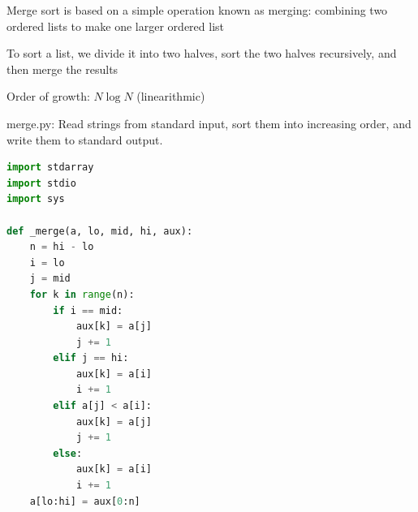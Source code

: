 \documentclass[8pt,a4paper,compress]{beamer}
\begin{document}
\begin{frame}[fragile]
\pause

Merge sort is based on a simple operation known as merging: combining two ordered lists to make one larger ordered list

\pause
\bigskip

To sort a list, we divide it into two halves, sort the two halves recursively, and then merge the results

\begin{center}
\end{center}

\pause
\bigskip

Order of growth: $N \log N$ (linearithmic)
\end{frame}

\begin{frame}[fragile]
\pause

\begin{framed}
\tiny merge.py: Read strings from standard input, sort them into increasing order, and write them to standard output.
\end{framed}

\begin{lstlisting}[language=Python]
import stdarray
import stdio
import sys

def _merge(a, lo, mid, hi, aux):
    n = hi - lo
    i = lo
    j = mid
    for k in range(n):
        if i == mid:
            aux[k] = a[j]
            j += 1
        elif j == hi:
            aux[k] = a[i]
            i += 1
        elif a[j] < a[i]:
            aux[k] = a[j]
            j += 1
        else:
            aux[k] = a[i]
            i += 1
    a[lo:hi] = aux[0:n]
\end{lstlisting}
\end{frame}
\end{document}
